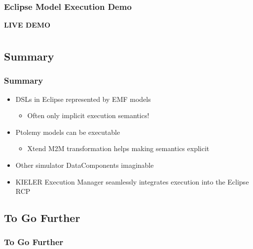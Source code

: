 \documentclass[notes,handout]{beamer}
\newcommand{\RED}[1]{\textcolor[rgb]{0.80,0.00,0.00}{#1}}
\begin{document}
\begin{frame}
  \frametitle{Eclipse Model Execution Demo}
  \begin{center} 
      \textbf{\Large {LIVE DEMO}}
  \end{center}
  \end{frame}

\section*{}

\subsection<presentation>[Summary]{Summary}
\begin{frame}
  \frametitle{Summary}
        \begin{itemize}
	           \item DSLs in Eclipse represented by EMF models
								\begin{itemize}
									 \pause
				           \item Often only implicit execution semantics!
								\end{itemize}
						 \pause
	           \item Ptolemy models can be executable
								\begin{itemize}
				           \pause
	    			       \item Xtend M2M transformation helps making semantics explicit
								\end{itemize}
						 \pause
						 \item Other simulator DataComponents imaginable
						 \pause
						 \item \RED{KIELER Execution Manager} seamlessly integrates execution into the Eclipse RCP
        \end{itemize}
\end{frame}

\subsection<presentation>[To Go Further]{To Go Further}
\begin{frame}
  \frametitle<presentation>[To Go Further]{To Go Further}
\normalsize
  
\end{frame}
\end{document}
